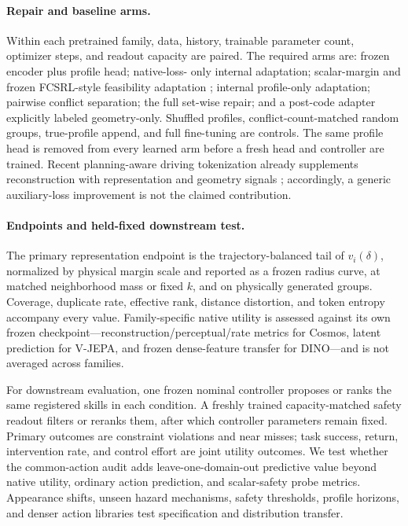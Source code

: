 \paragraph{Repair and baseline arms.}
Within each pretrained family, data, history, trainable parameter count, optimizer steps, and
readout capacity are paired.  The required arms are: frozen encoder plus profile head; native-loss-
only internal adaptation; scalar-margin and frozen FCSRL-style feasibility adaptation
\citep{cen2024feasibility}; internal profile-only adaptation; pairwise conflict separation; the full
set-wise repair; and a post-code adapter explicitly labeled geometry-only.  Shuffled profiles,
conflict-count-matched random groups, true-profile append, and full fine-tuning are controls.  The
same profile head is removed from every learned arm before a fresh head and controller are trained.
Recent planning-aware driving tokenization already supplements reconstruction with representation
and geometry signals \citep{yao2026unified}; accordingly, a generic auxiliary-loss improvement is
not the claimed contribution.

\paragraph{Endpoints and held-fixed downstream test.}
The primary representation endpoint is the trajectory-balanced tail of $v_i(\delta)$, normalized by
physical margin scale and reported as a frozen radius curve, at matched neighborhood mass or fixed
$k$, and on physically generated groups.  Coverage, duplicate rate, effective rank, distance
distortion, and token entropy accompany every value.  Family-specific native utility is assessed
against its own frozen checkpoint---reconstruction/perceptual/rate metrics for Cosmos, latent
prediction for V-JEPA, and frozen dense-feature transfer for DINO---and is not averaged across
families.

For downstream evaluation, one frozen nominal controller proposes or ranks the same registered
skills in each condition.  A freshly trained capacity-matched safety readout filters or reranks
them, after which controller parameters remain fixed.  Primary outcomes are constraint violations
and near misses; task success, return, intervention rate, and control effort are joint utility
outcomes.  We test whether the common-action audit adds leave-one-domain-out predictive value beyond
native utility, ordinary action prediction, and scalar-safety probe metrics.  Appearance shifts,
unseen hazard mechanisms, safety thresholds, profile horizons, and denser action libraries test
specification and distribution transfer.

